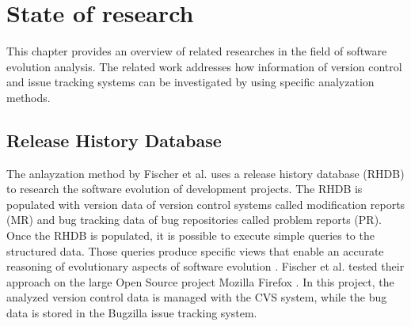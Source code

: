 \section{State of research}
\label{sec:state_of_research}
This chapter provides an overview of related researches in the field of software evolution analysis. The related work addresses how information of version control and issue tracking systems can be investigated by using specific analyzation methods.

\subsection{Release History Database}
The anlayzation method by Fischer et al. \cite{fischer2003populating} uses a release history database (RHDB) to research the software evolution of development projects. The RHDB is populated with version data of version control systems called modification reports (MR) and bug tracking data of bug repositories called problem reports (PR). Once the RHDB is populated, it is possible to execute simple queries to the structured data. Those queries produce specific views that enable an accurate reasoning of evolutionary aspects of software evolution \cite{fischer2003populating}.
Fischer et al. tested their approach on the large Open Source project Mozilla Firefox \cite{mozilla}. In this project, the analyzed version control data is managed with the CVS \cite{cvs} system, while the bug data is stored in the Bugzilla \cite{bugzilla} issue tracking system. 

